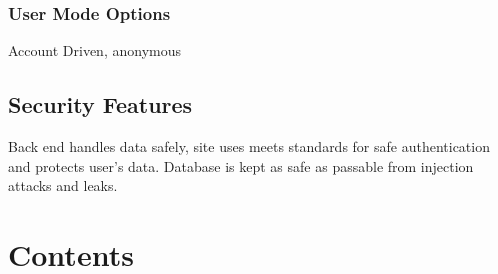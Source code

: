 \documentclass[]{article}
\begin{document}
\subsubsection{User Mode Options}
Account Driven, anonymous 

\subsection{Security Features}
Back end handles data safely, site uses meets standards for safe authentication and protects user's data. Database is kept as safe as passable from injection attacks and leaks. 



\newpage
\section{Contents}\label{cont}
\tableofcontents
\end{document}
